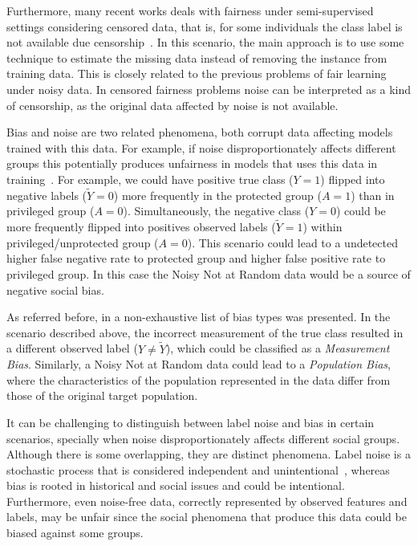 Furthermore, many recent works deals with fairness under semi-supervised settings considering censored data, that is, for some individuals the class label is not available due censorship~\citep{WZhang2022,WZhang2023_a,WZhang2023_b,WZhang2023_c}. In this scenario, the main approach is to use some technique to estimate the missing data instead of removing the instance from training data. This is closely related to the previous problems of fair learning under noisy data. In censored fairness problems noise can be interpreted as a kind of censorship, as the original data affected by noise is not available.

Bias and noise are two related phenomena, both corrupt data affecting models trained with this data. For example, if noise disproportionately affects different groups this potentially produces unfairness in models that uses this data in training~\citep{Wang2021}. For example, we could have positive true class ($Y = 1$) flipped into negative labels ($\tilde{Y} =0$) more frequently in the protected group ($A = 1$) than in privileged group ($A = 0$). Simultaneously, the negative class ($Y = 0$) could be more frequently flipped into positives observed labels ($\tilde{Y} = 1$) within privileged/unprotected group ($A = 0$). This scenario could lead to a undetected higher false negative rate to protected group and higher false positive rate to privileged group. In this case the Noisy Not at Random data would be a source of negative social bias.

As referred before, in \cite{Mehrabi2019} a non-exhaustive list of bias types was presented. In the scenario described above, the incorrect measurement of the true class resulted in a different observed label ($Y \neq \tilde{Y}$), which could be classified as a \textit{Measurement Bias}. Similarly, a Noisy Not at Random data could lead to a \textit{Population Bias}, where the characteristics of the population represented in the data differ from those of the original target population.

It can be challenging to distinguish between label noise and bias in certain scenarios, specially when noise disproportionately affects different social groups. Although there is some overlapping, they are distinct phenomena. Label noise is a stochastic process that is considered independent and unintentional~\citep{Frenay2014}, whereas bias is rooted in historical and social issues and could be intentional. Furthermore, even noise-free data, correctly represented by observed features and labels, may be unfair since the social phenomena that produce this data could be biased against some groups.

